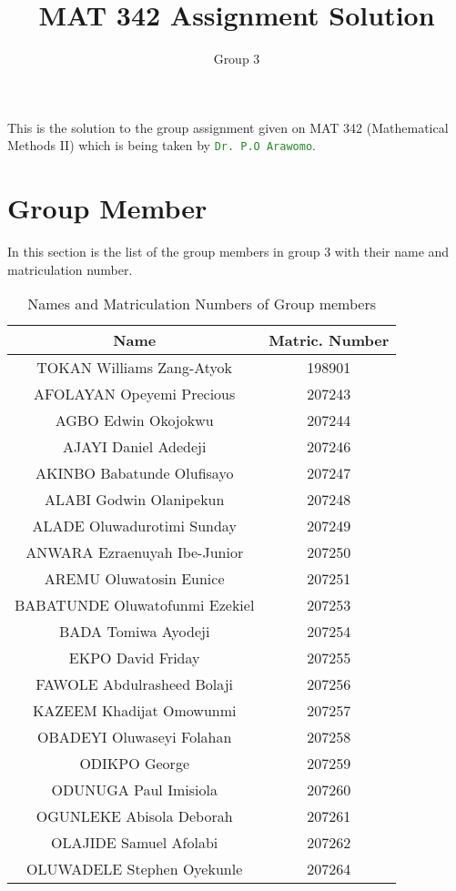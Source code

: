 \documentclass[12pt]{scrartcl}
\title{MAT 342 Assignment Solution}
\author{Group 3}
\newcommand{\mytt}[1]{\textcolor{ForestGreen}{\texttt{#1}}}
\begin{document}
\baselineskip24pt
	\maketitle
	This is the solution to the group assignment given on MAT 342 (Mathematical Methods II) which is being taken by \mytt{Dr. P.O Arawomo}.
	\section{Group Member}
	In this section is the list of the group members in group 3 with their name and matriculation number.
	
	\begin{table}[H]
		\setlength\extrarowheight{2pt}
		\centering
		\begin{tabular}{|c|c|}
			\hline 
			\textbf{Name} & \textsf{Matric. Number} \\
			\hline 
			TOKAN Williams Zang-Atyok & 198901 \\
			\hline
			AFOLAYAN Opeyemi Precious & 207243 \\
			\hline
			AGBO Edwin Okojokwu  & 207244 \\
			\hline
			AJAYI Daniel Adedeji & 207246 \\
			\hline
			AKINBO Babatunde Olufisayo & 207247 \\
			\hline
			ALABI Godwin Olanipekun & 207248 \\
			\hline
			ALADE Oluwadurotimi Sunday & 207249 \\
			\hline
			ANWARA Ezraenuyah Ibe-Junior & 207250 \\
			\hline
			AREMU Oluwatosin Eunice & 207251 \\
			\hline
			BABATUNDE Oluwatofunmi Ezekiel & 207253 \\
			\hline
			BADA Tomiwa Ayodeji & 207254 \\
			\hline
			EKPO David Friday & 207255 \\
			\hline
			FAWOLE Abdulrasheed Bolaji & 207256 \\
			\hline
			KAZEEM Khadijat Omowunmi & 207257 \\
			\hline
			OBADEYI Oluwaseyi Folahan & 207258 \\
			\hline
			ODIKPO George & 207259 \\
			\hline
			ODUNUGA Paul Imisiola & 207260 \\
			\hline
			OGUNLEKE Abisola Deborah & 207261 \\
			\hline
			OLAJIDE Samuel Afolabi & 207262 \\
			\hline
			OLUWADELE Stephen Oyekunle & 207264 \\
			\hline
		\end{tabular}
	\caption{Names and Matriculation Numbers of Group members}
	\end{table}
\label{sec:1}
\end{document}
